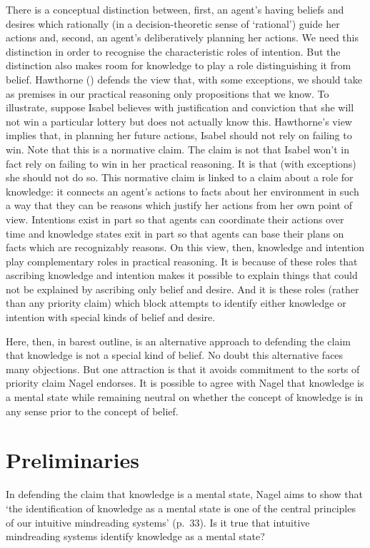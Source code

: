 \documentclass[11pt,a4paper]{extarticle}
\begin{document}
There is a conceptual distinction between,
first,
an agent's having beliefs and desires which rationally 
(in a decision-theoretic sense of `rational') 
guide her actions
and,
second,
 an agent's deliberatively planning her actions.
We need this distinction in order to recognise the characteristic roles of intention.
But the distinction also makes room for knowledge to play a role distinguishing it from belief.
Hawthorne (\citeyear[pp.\ 29--31]{Hawthorne:2004ov}) defends the view that, with some exceptions, we should take as premises in our practical reasoning only propositions that we know.  
To illustrate, suppose Isabel believes with justification and conviction that she will not win a particular lottery but does not actually know this.  
Hawthorne's view implies that, in planning her future actions, Isabel should not rely on failing to win.  
Note that this is a normative claim.  
The claim is not that Isabel won't in fact rely on failing to win in her practical reasoning.  
It is that (with exceptions) she should not do so.  
This normative claim is linked to a claim about a role for knowledge: 
it connects an agent's actions to facts about her environment in such a way that they can be reasons which justify her actions from her own point of view.
Intentions exist in part so that agents can coordinate their actions over time 
and 
knowledge states exit in part so that agents can base their plans on facts which are recognizably reasons.
On this view, then, knowledge and intention play complementary roles in practical reasoning.
It is because of these roles that ascribing knowledge and intention makes it possible to explain things that could not be explained by ascribing only belief and desire.
And it is these roles 
(rather than any priority claim)
which block attempts to identify either knowledge or intention with special kinds of belief and desire.

Here, then, in barest outline, is an alternative approach to defending the claim that knowledge is not a special kind of belief.
No doubt this alternative faces many objections.
But one attraction is that it avoids commitment to the sorts of priority claim Nagel endorses.
It is possible to agree with Nagel that knowledge is a mental state while remaining neutral on whether the concept of knowledge is in any sense prior to the concept of belief.





\section{Preliminaries}
In defending the claim that knowledge is a mental state, Nagel aims to show that `the identification of knowledge as a mental state is one of the central principles of our intuitive mindreading systems' (p.\ 33).
Is it true that intuitive mindreading systems identify knowledge as a mental state?
\end{document}
